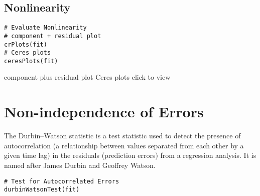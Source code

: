 \documentclass{article}
\begin{document}
\subsection{Nonlinearity}
\begin{framed}
	\begin{verbatim}
# Evaluate Nonlinearity
# component + residual plot 
crPlots(fit)
# Ceres plots 
ceresPlots(fit)
\end{verbatim}
\end{framed}
component plus residual plot Ceres plots click to view
\section{Non-independence of Errors}

The Durbin–Watson statistic is a test statistic used to detect the presence of autocorrelation (a relationship between values separated from each other by a given time lag) in the residuals (prediction errors) from a regression analysis. It is named after James Durbin and Geoffrey Watson.
\begin{framed}
	\begin{verbatim}
# Test for Autocorrelated Errors
durbinWatsonTest(fit)
\end{verbatim}
\end{framed}
\end{document}
